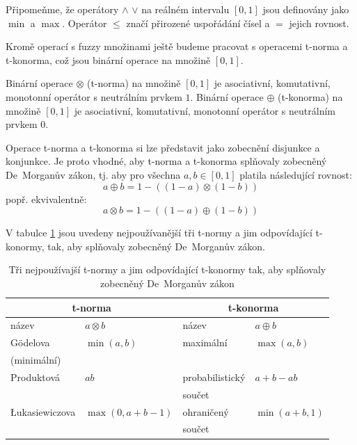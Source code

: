 Připomeňme, že operátory $\wedge$ $\vee$ na reálném intervalu $[0, 1]$ jsou definovány jako $\min$ a $\max$. Operátor $\le$ značí přirozené uspořádání čísel a $=$ jejich rovnost.

Kromě operací s fuzzy množinami ještě budeme pracovat s operacemi t-norma a t-konorma, což jsou binární operace na množině $[0,1]$.
\begin{definition}
 Binární operace $\otimes$ (t-norma) na množině $[0,1]$ je asociativní, komutativní, monotonní operátor s neutrálním prvkem $1$.
 Binární operace $\oplus$  (t-konorma) na množině $[0,1]$ je asociativní, komutativní, monotonní operátor s neutrálním prvkem $0$.
\end{definition}

Operace t-norma a t-konorma si lze představit jako zobecnění disjunkce a konjunkce. Je proto vhodné, aby t-norma a t-konorma splňovaly zobecněný De~Morganův zákon, tj. aby pro všechna $a, b \in [0,1]$ platila následující rovnost:
$$
  a \oplus b = 1 - ((1 - a) \otimes (1 - b))
$$
popř. ekvivalentně:
$$
  a \otimes b = 1 - ((1 - a) \oplus (1 - b))
$$

V tabulce \ref{tbl:Norms} jsou uvedeny nejpoužívanější tři t-normy a jim odpovídající t-konormy, tak, aby splňovaly zobecněný De~Morganův zákon.
\begin{table}
 \centering
 \begin{tabular}{|l|l||l|l|}
  \hline
  \multicolumn{2}{|c|}{t-norma}			& \multicolumn{2}{|c|}{t-konorma}			\\\hline 
  název	 		& $a \otimes b$		& název				& $a \oplus b$		\\\hline \hline
  Gödelova 		& $\min(a, b)$ 		& maximální 			& $\max(a, b)$		\\
  (minimální) 		&			&				&			\\\hline
  Produktová 		& $a b$ 		& probabilistický  		& $a + b - a b$		\\
			&			& součet			&			\\\hline
  \L{}ukasiewiczova 	& $\max(0, a + b - 1)$ 	& ohraničený 			& $\min(a + b, 1)$	\\
			&			& součet			&			\\\hline
 \end{tabular}

 \caption[Tři nejpoužívajší t-normy]{Tři nejpoužívajší t-normy a jim odpovídající t-konormy tak, aby splňovaly zobecněný De~Morganův zákon}
 \label{tbl:Norms}
\end{table}

